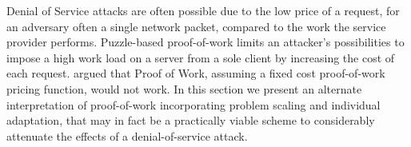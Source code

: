 %
%

Denial of Service attacks are often possible due to the low price of a request, for an adversary often a single network packet\cite{gunter}, compared to the work the service provider performs. Puzzle-based proof-of-work limits an attacker's possibilities to impose a high work load on a server from a sole client by increasing the cost of each request.   argued that Proof of Work, assuming a fixed cost proof-of-work pricing function, would not work. In this section we present an alternate interpretation of proof-of-work incorporating problem scaling and individual adaptation, that may in fact be a practically viable scheme to considerably attenuate the effects of a denial-of-service attack.

